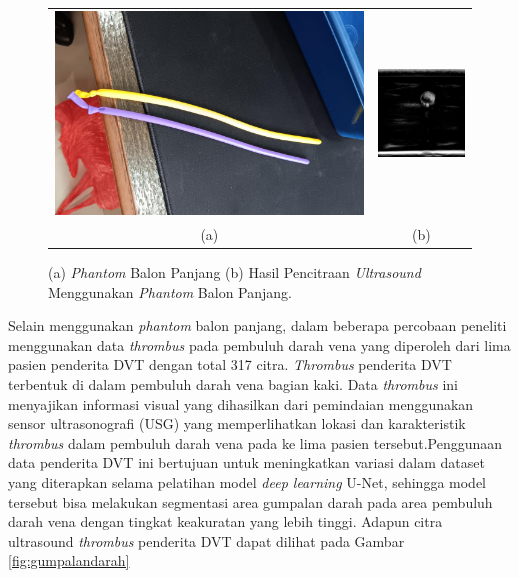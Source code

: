 \begin{figure}[h]
        \centering
	\begin{tabular}{ll}
		\includegraphics[scale=0.18]{bab3/phantom_balon.jpg}
		&
		\includegraphics[scale=0.6]{bab3/img_thrombus.png} \\
		\multicolumn{1}{c}{(a)} & \multicolumn{1}{c}{(b)}
	\end{tabular}
	\caption{(a) \textit{Phantom} Balon Panjang (b) Hasil Pencitraan \textit{Ultrasound} Menggunakan \textit{Phantom} Balon Panjang.}
	\label{Fig:phantom_baloon}
\end{figure}

Selain menggunakan \textit{phantom} balon panjang, dalam beberapa percobaan peneliti menggunakan data \textit{thrombus} pada pembuluh darah vena yang diperoleh dari lima pasien penderita DVT dengan total 317 citra. \textit{Thrombus} penderita DVT terbentuk di dalam pembuluh darah vena bagian kaki. Data \textit{thrombus} ini menyajikan informasi visual yang dihasilkan dari pemindaian menggunakan sensor ultrasonografi (USG) yang memperlihatkan lokasi dan karakteristik \textit{thrombus} dalam pembuluh darah vena pada ke lima pasien tersebut.Penggunaan data penderita DVT ini bertujuan untuk meningkatkan variasi dalam dataset yang diterapkan selama pelatihan model \textit{deep learning} U-Net, sehingga model tersebut bisa melakukan segmentasi area gumpalan darah pada area pembuluh darah vena dengan tingkat keakuratan yang lebih tinggi. Adapun citra ultrasound \textit{thrombus} penderita DVT dapat dilihat pada Gambar \ref{fig:gumpalandarah}

